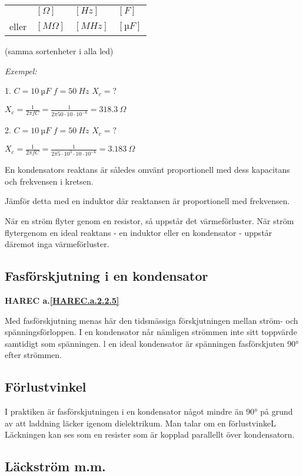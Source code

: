 \begin{tabular}{llll}
  &  \([\Omega]\) & \([Hz]\) & \([F]\)    \\
  eller & \([M\Omega]\) & \([MHz]\) & \([µF]\)
\end{tabular}

(samma sortenheter i alla led)

\emph{Exempel:}

1. \(C = 10\ µF\) \(f = 50\ Hz\) \(X_c = ?\)

\(X_c = \frac{1}{2πfC} = \frac{1}{2π 50 \cdot 10 \cdot 10^{-6}} = 318.3\ Ω\)

2. \(C = 10\ µF\) \(f = 50\ Hz\) \(X_c = ?\)

\(X_c = \frac{1}{2πfC} = \frac{1}{2π 5 \cdot 10^3 \cdot 10 \cdot 10^{-6}}
= 3.183\ Ω\)

En kondensators reaktans är således omvänt proportionell med dess kapacitans
och frekvensen i kretsen.

Jämför detta med en induktor där reaktansen är proportionell med frekvensen.

När en ström flyter genom en resistor, så uppstår det värmeförluster. När ström
flytergenom en ideal reaktans - en induktor eller en kondensator - uppstår
däremot inga värmeförluster.

\subsection{Fasförskjutning i en kondensator}
\textbf{HAREC a.\ref{HAREC.a.2.2.5}\label{myHAREC.a.2.2.5}}

Med fasförskjutning menas här den tidsmässiga förskjutningen mellan ström- och
spänningsförloppen. I en kondensator når nämligen strömmen inte sitt toppvärde
samtidigt som spänningen. l en ideal kondensator är spänningen fasförskjuten 90°
efter strömmen.

\subsection{Förlustvinkel}

I praktiken är fasförskjutningen i en kondensator något mindre än 90° på grund
av att laddning läcker igenom dielektrikum. Man talar om en förlustvinkeL
Läckningen kan ses som en resister som är kopplad parallellt över kondensatorn.


\subsection{Läckström m.m.}

